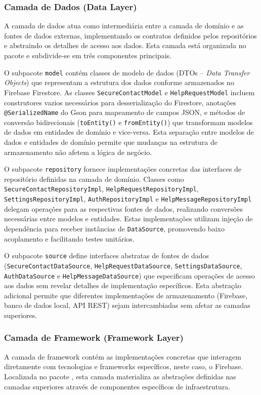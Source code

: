 \subsubsection{Camada de Dados (Data Layer)}
A camada de dados atua como intermediária entre a camada de domínio e as fontes de dados externas, implementando os contratos definidos pelos repositórios e abstraindo os detalhes de acesso aos dados. Esta camada está organizada no pacote  e subdivide-se em três componentes principais.

O subpacote \texttt{model} contém classes de modelo de dados (DTOs -- \textit{Data Transfer Objects}) que representam a estrutura dos dados conforme armazenados no Firebase Firestore. As classes \texttt{SecureContactModel} e \texttt{HelpRequestModel} incluem construtores vazios necessários para desserialização do Firestore, anotações \texttt{@SerializedName} do Gson para mapeamento de campos JSON, e métodos de conversão bidirecionais (\texttt{toEntity()} e \texttt{fromEntity()}) que transformam modelos de dados em entidades de domínio e vice-versa. Esta separação entre modelos de dados e entidades de domínio permite que mudanças na estrutura de armazenamento não afetem a lógica de negócio.

O subpacote \texttt{repository} fornece implementações concretas das interfaces de repositório definidas na camada de domínio. Classes como \texttt{SecureContactRepositoryImpl}, \texttt{HelpRequestRepositoryImpl}, \texttt{SettingsRepositoryImpl}, \texttt{AuthRepositoryImpl} e \texttt{HelpMessageRepositoryImpl} delegam operações para as respectivas fontes de dados, realizando conversões necessárias entre modelos e entidades. Estas implementações utilizam injeção de dependência para receber instâncias de \texttt{DataSource}, promovendo baixo acoplamento e facilitando testes unitários.

O subpacote \texttt{source} define interfaces abstratas de fontes de dados (\texttt{SecureContactDataSource}, \texttt{HelpRequestDataSource}, \texttt{SettingsDataSource}, \texttt{AuthDataSource} e \texttt{HelpMessageDataSource}) que especificam operações de acesso aos dados sem revelar detalhes de implementação específicos. Esta abstração adicional permite que diferentes implementações de armazenamento (Firebase, banco de dados local, API REST) sejam intercambiadas sem afetar as camadas superiores.

\subsubsection{Camada de Framework (Framework Layer)}
A camada de framework contém as implementações concretas que interagem diretamente com tecnologias e frameworks específicos, neste caso, o Firebase. Localizada no pacote , esta camada materializa as abstrações definidas nas camadas superiores através de componentes específicos de infraestrutura.

